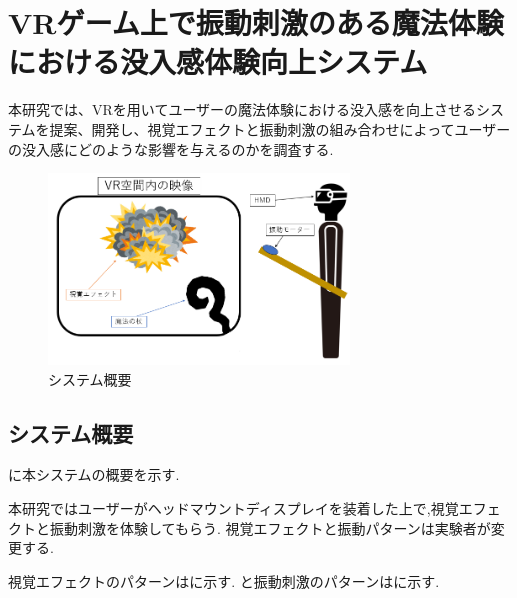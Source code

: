 \chapter{VRゲーム上で振動刺激のある魔法体験における没入感体験向上システム}
本研究では、VRを用いてユーザーの魔法体験における没入感を向上させるシステムを提案、開発し、視覚エフェクトと振動刺激の組み合わせによってユーザーの没入感にどのような影響を与えるのかを調査する.


\begin{figure}[b]
\centering
\includegraphics[clip,width=8cm]{./fig/allsystem.png}
\caption{システム概要}\label{allsystem}
\end{figure}

\section{システム概要}
に本システムの概要を示す.

本研究ではユーザーがヘッドマウントディスプレイを装着した上で,視覚エフェクトと振動刺激を体験してもらう.
視覚エフェクトと振動パターンは実験者が変更する.


視覚エフェクトのパターンはに示す.
と振動刺激のパターンはに示す.



